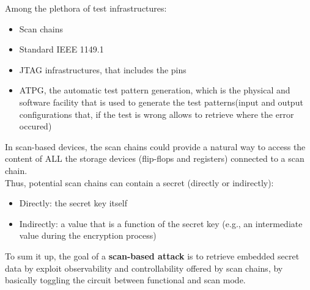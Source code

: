 Among the plethora of test infrastructures:
\begin{itemize}
  \item Scan chains
  \item Standard IEEE 1149.1
  \item JTAG infrastructures, that includes the pins
  \item ATPG, the automatic test pattern generation, which is the physical and software facility
    that is used to generate the test patterns(input and output configurations that, if the test is
    wrong allows to retrieve where the error occured)
\end{itemize}
In scan-based devices, the scan chains could provide a natural way to access the content of ALL the
storage devices (flip-flops and registers) connected to a scan chain.\\
Thus, potential scan chains can contain a secret (directly or indirectly):
\begin{itemize}
  \item Directly: the secret key itself
  \item Indirectly: a value that is a function of the secret key (e.g., an intermediate value during
    the encryption process)
\end{itemize}
\begin{boxH}
  To sum it up, the goal of a \textbf{scan-based attack} is to retrieve embedded secret data by 
  exploit observability and controllability offered by scan chains, by basically toggling the
  circuit between functional and scan mode.
\end{boxH}
